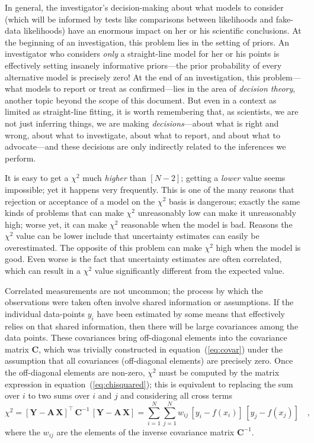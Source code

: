 \documentclass[12pt,twoside,pdftex]{article}
\newcommand{\documentname}{document}
\newcommand{\equationname}{equation}
\newcounter{problem}
\newcommand{\mmatrix}[1]{\boldsymbol{#1}}
\newcommand{\inverse}[1]{{#1}^{-1}}
\newcommand{\transpose}[1]{{#1}^{\scriptscriptstyle \top}}
\newcommand{\mA}{\mmatrix{A}}
\newcommand{\mC}{\mmatrix{C}}
\newcommand{\mCinv}{\inverse{\mC}}
\newcommand{\mX}{\mmatrix{X}}
\newcommand{\mY}{\mmatrix{Y}}
\begin{document}
{  In general, the investigator's decision-making about what models to
  consider (which will be informed by tests like comparisons between
  likelihoods and fake-data likelihoods) have an enormous impact on
  her or his scientific conclusions.  At the beginning of an
  investigation, this problem lies in the setting of priors.  An
  investigator who considers \emph{only} a straight-line model for her
  or his points is effectively setting insanely informative
  priors---the prior probability of every alternative model is
  precisely zero!  At the end of an investigation, this problem---what
  models to report or treat as confirmed---lies in the area of
  \emph{decision theory}, another topic beyond the scope of this
  \documentname.  But even in a context as limited as straight-line
  fitting, it is worth remembering that, as scientists, we are not
  just inferring things, we are making \emph{decisions}---about what
  is right and wrong, about what to investigate, about what to report,
  and about what to advocate---and these decisions are only indirectly
  related to the inferences we perform.}

It is easy to get a $\chi^2$ much \emph{higher} than $[N-2]$; getting
a \emph{lower} value seems impossible; yet it happens very frequently.
This is one of the many reasons that rejection or acceptance of a
model on the $\chi^2$ basis is dangerous; exactly the same kinds of
problems that can make $\chi^2$ unreasonably low can make it
unreasonably high; worse yet, it can make $\chi^2$ reasonable when the
model is bad.  Reasons the $\chi^2$ value can be lower include that
uncertainty estimates can easily be overestimated. The opposite of
this problem can make $\chi^2$ high when the model is good. Even worse
is the fact that uncertainty estimates are often correlated, which can
result in a $\chi^2$ value significantly different from the expected
value.

Correlated measurements are not uncommon; the process by which the
observations were taken often involve shared information or
assumptions. If the individual data-points $y_i$ have been estimated
by some means that effectively relies on that shared information, then
there will be large covariances among the data points.  These
covariances bring off-diagonal elements into the covariance matrix
$\mC$, which was trivially constructed in
\equationname~(\ref{eq:covar}) under the assumption that all
covariances (off-diagonal elements) are precisely zero.  Once the
off-diagonal elements are non-zero, $\chi^2$ must be computed by the
matrix expression in \equationname~(\ref{eq:chisquared}); this is
equivalent to replacing the sum over $i$ to two sums over $i$ and $j$
and considering all cross terms
\begin{equation}
\chi^2 =
 \transpose{\left[\mY-\mA\,\mX\right]}\,\mCinv\,\left[\mY-\mA\,\mX\right]
 = \sum_{i=1}^N \sum_{j=1}^N
 w_{ij}\,\left[y_i-f(x_i)\right]\,\left[y_j-f(x_j)\right]
 \quad,
\end{equation} 
where the $w_{ij}$ are the elements of the inverse covariance
matrix $\inverse{\mC}$.
\end{document}
